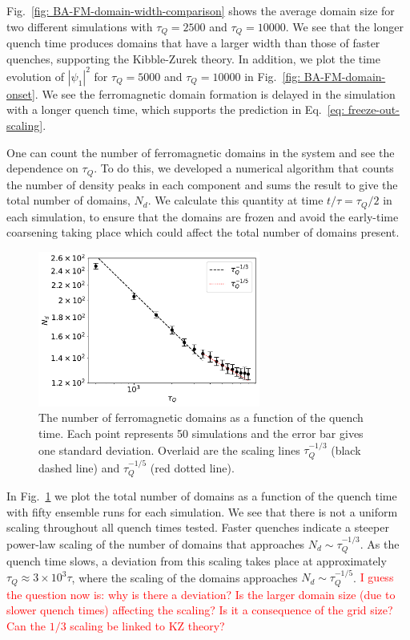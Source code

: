 Fig.~\ref{fig: BA-FM-domain-width-comparison} shows the average domain size
for two different simulations with \(\tau_Q=2500\) and \(\tau_Q=10000\).
We see that the longer quench time produces domains that have a
larger width than those of faster quenches, supporting the Kibble-Zurek theory.
In addition, we plot the time evolution of \(|\psi_1|^2\) for \(\tau_Q=5000\) and
\(\tau_Q=10000\) in Fig.~\ref{fig: BA-FM-domain-onset}.
We see the ferromagnetic domain formation is delayed in the simulation
with a longer quench time, which supports the prediction in
Eq.~\eqref{eq: freeze-out-scaling}.

One can count the number of ferromagnetic domains in the system and see the
dependence on \( \tau_Q \).
To do this, we developed a numerical algorithm that counts the number of
density peaks in each component and sums the result to give the total number of
domains, \(N_d\).
We calculate this quantity at time \(t/\tau=\tau_Q/2\) in each simulation, to
ensure that the domains are frozen and avoid the early-time coarsening
taking place which could affect the total number of domains present.
\begin{figure}
    \centering
    \includegraphics[width=0.65\textwidth]{gfx/ch-spin1/FM_domains_scaling.pdf}
    \caption[Total ferromagnetic domains in the system versus the quench rate
        \(\tau_Q\)]
    {The number of ferromagnetic domains as a function of the
        quench time. Each point represents 50 simulations and the
        error bar gives one standard deviation. Overlaid are the scaling lines
        \(\tau_Q^{-1/3}\) (black dashed line) and \(\tau_Q^{-1/5}\)
        (red dotted line).\label{fig: FM-domains-scaling}}
\end{figure}
In Fig.~\ref{fig: FM-domains-scaling} we plot the total number of domains
as a function of the quench time with fifty ensemble runs for each simulation.
We see that there is not a uniform scaling throughout all quench times tested.
Faster quenches indicate a steeper power-law scaling of the number of domains
that approaches \(N_d\sim\tau_Q^{-1/3}\).
As the quench time slows, a deviation from this scaling takes place at
approximately \(\tau_Q\approx 3\times10^3\tau \), where the scaling of the
domains approaches \(N_d\sim\tau_Q^{-1/5}\).
\textcolor{red}{I guess the question now is: why is there a deviation?
    Is the larger domain size (due to slower quench times) affecting the scaling?
    Is it a consequence of the grid size? Can the \(1/3\) scaling be linked to KZ
    theory?}

